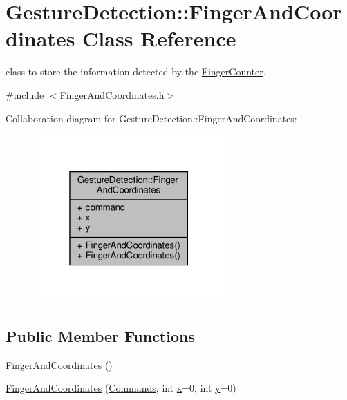 \hypertarget{class_gesture_detection_1_1_finger_and_coordinates}{}\section{Gesture\+Detection\+:\+:Finger\+And\+Coordinates Class Reference}
\label{class_gesture_detection_1_1_finger_and_coordinates}


class to store the information detected by the \hyperlink{class_gesture_detection_1_1_finger_counter}{Finger\+Counter}.  




{\ttfamily \#include $<$Finger\+And\+Coordinates.\+h$>$}



Collaboration diagram for Gesture\+Detection\+:\+:Finger\+And\+Coordinates\+:
\nopagebreak
\begin{figure}[H]
\begin{center}
\leavevmode
\includegraphics[width=208pt]{class_gesture_detection_1_1_finger_and_coordinates__coll__graph}
\end{center}
\end{figure}
\subsection*{Public Member Functions}
\begin{DoxyCompactItemize}
\item 
\hyperlink{class_gesture_detection_1_1_finger_and_coordinates_a9d24b8b3b3237f0a39762a52daf6f6a5}{Finger\+And\+Coordinates} ()
\item 
\hyperlink{class_gesture_detection_1_1_finger_and_coordinates_a907ced00a2a2075194c38b9a356bfb60}{Finger\+And\+Coordinates} (\hyperlink{_commands_8h_a1939e90743463fb34c8c571ec0590430}{Commands}, int \hyperlink{class_gesture_detection_1_1_finger_and_coordinates_ad4442375646440085aafa4d366b2eb6b}{x}=0, int \hyperlink{class_gesture_detection_1_1_finger_and_coordinates_a2e975227cf1ed24857600d35ee84e258}{y}=0)
\end{DoxyCompactItemize}
